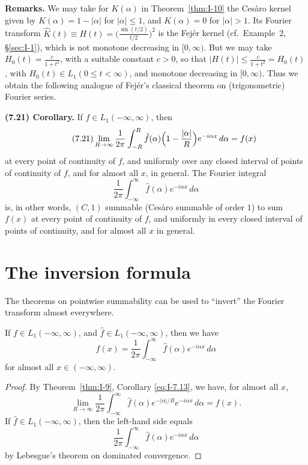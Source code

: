 \noindent\textbf{Remarks.}
We may take for $K(\alpha)$ in Theorem~\ref{thm:I-10} the Ces\`aro kernel given by $K(\alpha)=1-|\alpha|$ for $|\alpha|\le 1$, and $K(\alpha)=0$ for $|\alpha|>1$. Its Fourier transform $\hat K(t)\equiv H(t)=\bigl(\frac{\sin(t/2)}{t/2}\bigr)^2$ is the Fej\'er kernel (cf.\ Example~2, \S\ref{sec:I-1}), which is not monotone decreasing in $[0,\infty)$. But we may take $H_0(t)=\frac{c}{1+t^2}$, with a suitable constant $c>0$, so that $|H(t)|\le\frac{c}{1+t^2}=H_0(t)$, with $H_0(t)\in L_1(0\le t<\infty)$, and monotone decreasing in $[0,\infty)$. Thus we obtain the following analogue of Fej\'er's classical theorem on (trigonometric) Fourier series.

\noindent\textbf{(7.21) Corollary.}
If $f\in L_1(-\infty,\infty)$, then
\begin{equation}\label{eq:I-7.21}\tag{7.21}
\lim_{R\to\infty}\frac{1}{2\pi}\int_{-R}^{R}\hat f(\alpha)\Bigl(1-\frac{|\alpha|}{R}\Bigr)e^{-i\alpha x}\,d\alpha=f(x)
\end{equation}
at every point of continuity of $f$, and uniformly over any closed interval of points of continuity of $f$, and for almost all $x$, in general. The Fourier integral
\begin{equation*}
\frac{1}{2\pi}\int_{-\infty}^{\infty}\hat f(\alpha)e^{-i\alpha x}\,d\alpha
\end{equation*}
is, in other words, $(C,1)$ summable (Ces\`aro summable of order $1$) to sum $f(x)$ at every point of continuity of $f$, and uniformly in every closed interval of points of continuity, and for almost all $x$ in general.

\section{The inversion formula}
\label{sec:I-8}

The theorems on pointwise summability can be used to ``invert'' the Fourier transform almost everywhere.

\begin{theorem}\label{thm:I-11}
If $f\in L_1(-\infty,\infty)$, and $\widehat f\in L_1(-\infty,\infty)$, then we have
\begin{equation*}
f(x)=\frac{1}{2\pi}\int_{-\infty}^{\infty}\widehat f(\alpha)e^{-i\alpha x}\,d\alpha
\end{equation*}
for almost all $x\in(-\infty,\infty)$.
\end{theorem}

\begin{proof}
By Theorem~\ref{thm:I-9}, Corollary \eqref{eq:I-7.13}, we have, for almost all $x$,
\begin{equation*}
\lim_{R\to\infty}\frac{1}{2\pi}\int_{-\infty}^{\infty}\widehat f(\alpha)e^{-|\alpha|/R}e^{-i\alpha x}\,d\alpha=f(x).
\end{equation*}
If $\widehat f\in L_1(-\infty,\infty)$, then the left-hand side equals
\begin{equation*}
\frac{1}{2\pi}\int_{-\infty}^{\infty}\widehat f(\alpha)e^{-i\alpha x}\,d\alpha
\end{equation*}
by Lebesgue's theorem on dominated convergence.
\end{proof}

